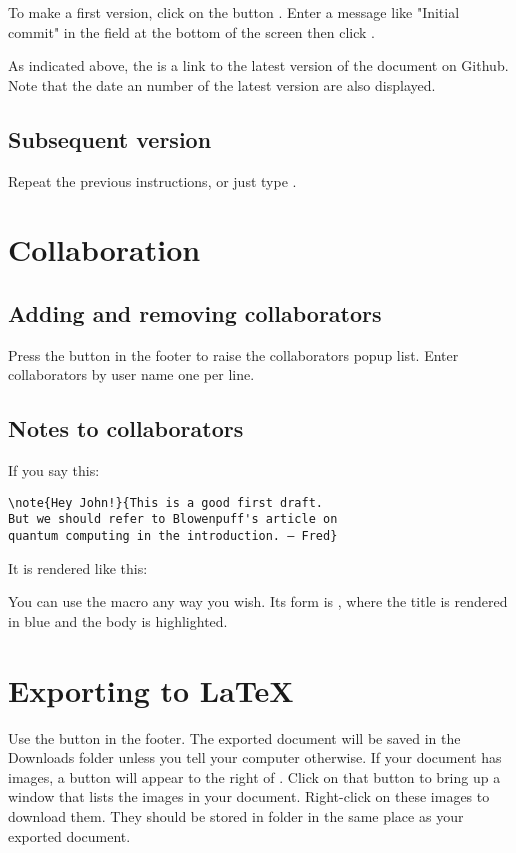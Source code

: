 To make a first version, click on the button . Enter a message like "Initial commit" in the field at the bottom of the screen then click .



As indicated above, the  is a link to the latest version of the document on Github. Note that the date an number of the latest version are also displayed.

\subsection{Subsequent version}

Repeat the previous instructions, or just type .

\section{Collaboration}

\subsection{Adding and removing collaborators}

Press the  button in the footer to raise the collaborators popup list.  Enter collaborators by user name one per line.


\subsection{Notes to collaborators}

If you say this:

\begin{verbatim}
\note{Hey John!}{This is a good first draft.
But we should refer to Blowenpuff's article on
quantum computing in the introduction. — Fred}
\end{verbatim}

It is rendered like this:


You can use the  macro any way you wish.  Its form is , where the title is rendered in blue and the body is highlighted.

\section{Exporting to LaTeX}

Use the  button in the footer.  The exported document will be saved in the Downloads folder unless you tell your computer otherwise.  If your document has images, a button  will appear to the right of .  Click on that button to bring up a window that lists the images in your document.  Right-click on these images to download them.  They should be stored in folder  in the same place as your exported document.



